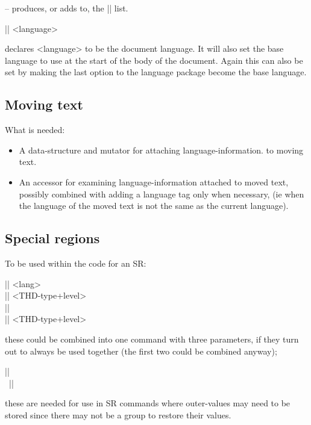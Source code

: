 \documentclass{ltxguide}
\begin{document}
-- produces, or adds to, the |\usedlanguages| list.



\begin{decl}
|\SetDocumentLanguage| <language>
\end{decl}

declares <language> to be the document language. It will also set the
base language to use at the start of the body of the document.  Again
this can also be set by making the last option to the language package
become the base language.


\subsection{Moving text}

What is needed:
\begin{itemize}
\item A data-structure and mutator for attaching language-information.
  to moving text.
\item An accessor for examining language-information attached to moved
  text, possibly combined with adding a language tag only when
  necessary, (ie when the language of the moved text is not the same
  as the current language).
\end{itemize}




\subsection{Special regions}

To be used within the code for an SR:

\begin{decl}
|\SetSRStartLanguage| <lang>       \\
|\SetSRInitLevel| <THD-type+level> \\
|\ExecuteSRStarttag|               \\
|\SetSRInnerLevel| <THD-type+level>
\end{decl}

these could be combined into one command with three parameters, if they
turn out to always be used together (the first two could be combined
anyway);

\begin{decl}
|\SRbegin| \\\
|\SRend|
\end{decl}

these are needed for use in SR commands where outer-values may need to
be stored since there may not be a group to restore their values.
\end{document}
